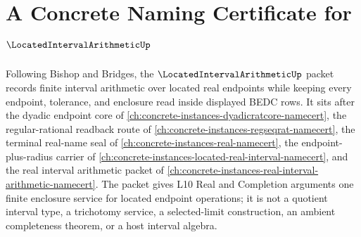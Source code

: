\chapter{A Concrete Naming Certificate for $\LocatedIntervalArithmeticUp$}
\label{ch:concrete-instances-located-interval-arithmetic-namecert}

Following Bishop and Bridges, the $\LocatedIntervalArithmeticUp$ packet records finite interval arithmetic over located real endpoints while keeping every endpoint, tolerance, and enclosure read inside displayed BEDC rows. It sits after the dyadic endpoint core of \autoref{ch:concrete-instances-dyadicratcore-namecert}, the regular-rational readback route of \autoref{ch:concrete-instances-regseqrat-namecert}, the terminal real-name seal of \autoref{ch:concrete-instances-real-namecert}, the endpoint-plus-radius carrier of \autoref{ch:concrete-instances-located-real-interval-namecert}, and the real interval arithmetic packet of \autoref{ch:concrete-instances-real-interval-arithmetic-namecert}. The packet gives L10 Real and Completion arguments one finite enclosure service for located endpoint operations; it is not a quotient interval type, a trichotomy service, a selected-limit construction, an ambient completeness theorem, or a host interval algebra.

